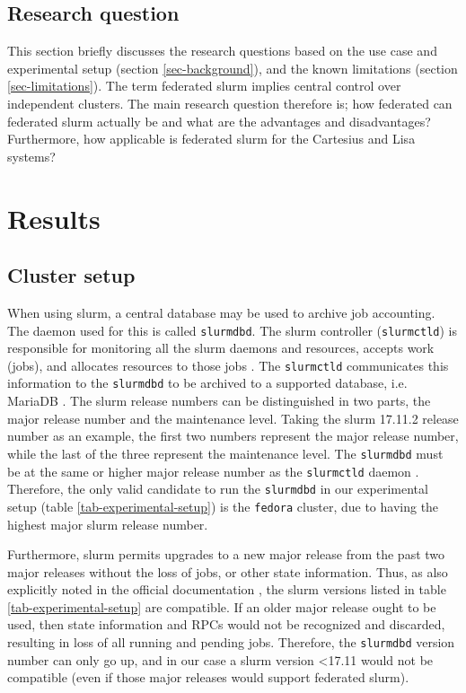 \documentclass[conference]{IEEEtran}
\begin{document}
\subsection{Research question}
This section briefly discusses the research questions based on the use case and experimental setup (section \ref{sec-background}), and the known limitations (section \ref{sec-limitations}). The term federated \gls{slurm} implies central control over independent clusters. The main research question therefore is; how federated can federated \gls{slurm} actually be and what are the advantages and disadvantages? Furthermore, how applicable is federated \gls{slurm} for the Cartesius and Lisa systems?


\section{Results}
\subsection{Cluster setup}
\label{sec-cluster-setup}
When using \gls{slurm}, a central database may be used to archive job accounting. The daemon used for this is called \texttt{slurmdbd}. The \gls{slurm} controller (\texttt{slurmctld}) is responsible for monitoring all the \gls{slurm} daemons and resources, accepts work (jobs), and allocates resources to those jobs \cite{slurm-slurmctld}. The \texttt{slurmctld} communicates this information to the \texttt{slurmdbd} to be archived to a supported database, i.e. MariaDB \cite{mariadb}.
The \gls{slurm} release numbers can be distinguished in two parts, the major release number and the maintenance level. Taking the \gls{slurm} 17.11.2 release number as an example, the first two numbers represent the major release number, while the last of the three represent the maintenance level. The \texttt{slurmdbd} must be at the same or higher major release number as the \texttt{slurmctld} daemon \cite{slurm-upgrade-guide}. Therefore, the only valid candidate to run the \texttt{slurmdbd} in our experimental setup (table \ref{tab-experimental-setup}) is the \texttt{fedora} cluster, due to having the highest major \gls{slurm} release number.

Furthermore, \gls{slurm} permits upgrades to a new major release from the past two major releases without the loss of jobs, or other state information. Thus, as also explicitly noted in the official documentation \cite{slurm-upgrade-guide}, the \gls{slurm} versions listed in table \ref{tab-experimental-setup} are compatible. If an older major release ought to be used, then state information and RPCs would not be recognized and discarded, resulting in loss of all running and pending jobs. Therefore, the \texttt{slurmdbd} version number can only go up, and in our case a \gls{slurm} version \textless 17.11 would not be compatible (even if those major releases would support federated \gls{slurm}).
\end{document}
